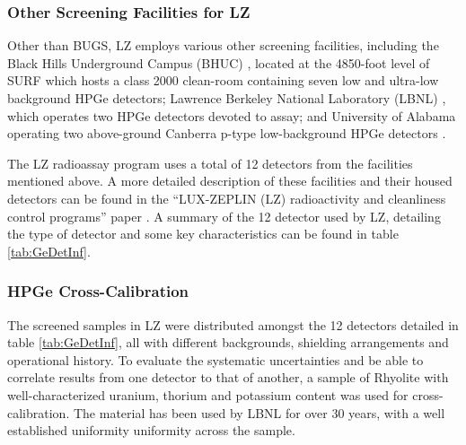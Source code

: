 \subsubsection{Other \gray{} Screening Facilities for LZ}

Other than BUGS, LZ employs various other \gray{} screening facilities, including the Black Hills Underground Campus (BHUC) \cite{Mount:2017iam}, located at the 4850-foot level of SURF which hosts a class 2000 clean-room containing seven low and ultra-low background HPGe detectors; Lawrence Berkeley National Laboratory (LBNL) \cite{Smith:2015aoa}, which operates two HPGe detectors devoted to assay; and University of Alabama operating two above-ground Canberra p-type low-background HPGe detectors \cite{Tsang:2019apx}.

The LZ radioassay program uses a total of 12 detectors from the facilities mentioned above. A more detailed description of these facilities and their housed detectors can be found in the ``LUX-ZEPLIN (LZ) radioactivity and cleanliness control programs'' paper \cite{lz_screening}. A summary of the 12 detector used by LZ, detailing the type of detector and some key characteristics can be found in table \ref{tab:GeDetInf}.




\subsubsection{HPGe Cross-Calibration}



The screened samples in LZ were distributed amongst the 12 detectors detailed in table \ref{tab:GeDetInf}, all with different backgrounds, shielding arrangements and operational history. To evaluate the systematic uncertainties and be able to correlate results from one detector to that of another, a sample of Rhyolite with well-characterized uranium, thorium and potassium content was used for cross-calibration. The material has been used by LBNL for over 30 years, with a well established uniformity uniformity across the sample.

